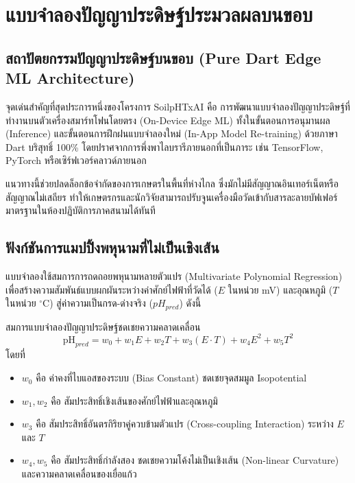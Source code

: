 \chapter{แบบจำลองปัญญาประดิษฐ์ประมวลผลบนขอบ}
\label{chap:edge_ml}

\section{สถาปัตยกรรมปัญญาประดิษฐ์บนขอบ (Pure Dart Edge ML Architecture)}
จุดเด่นสำคัญที่สุดประการหนึ่งของโครงการ SoilpHTxAI คือ การพัฒนาแบบจำลองปัญญาประดิษฐ์ที่ทำงานบนตัวเครื่องสมาร์ทโฟนโดยตรง (On-Device Edge ML) ทั้งในขั้นตอนการอนุมานผล (Inference) และขั้นตอนการฝึกฝนแบบจำลองใหม่ (In-App Model Re-training) ด้วยภาษา Dart บริสุทธิ์ 100\% โดยปราศจากการพึ่งพาไลบรารีภายนอกที่เป็นภาระ เช่น TensorFlow, PyTorch หรือเซิร์ฟเวอร์คลาวด์ภายนอก

แนวทางนี้ช่วยปลดล็อกข้อจำกัดของการเกษตรในพื้นที่ห่างไกล ซึ่งมักไม่มีสัญญาณอินเทอร์เน็ตหรือสัญญาณไม่เสถียร ทำให้เกษตรกรและนักวิจัยสามารถปรับจูนเครื่องมือวัดเข้ากับสารละลายบัฟเฟอร์มาตรฐานในห้องปฏิบัติการภาคสนามได้ทันที

\section{ฟังก์ชันการแมปปิ้งพหุนามที่ไม่เป็นเชิงเส้น}
แบบจำลองใช้สมการการถดถอยพหุนามหลายตัวแปร (Multivariate Polynomial Regression) เพื่อสร้างความสัมพันธ์แบบผกผันระหว่างค่าศักย์ไฟฟ้าที่วัดได้ ($E$ ในหน่วย mV) และอุณหภูมิ ($T$ ในหน่วย $^\circ\text{C}$) สู่ค่าความเป็นกรด-ด่างจริง ($pH_{pred}$) ดังนี้

\begin{formulabox}{สมการแบบจำลองปัญญาประดิษฐ์ชดเชยความคลาดเคลื่อน}
\begin{equation}
\text{pH}_{pred} = w_0 + w_1 E + w_2 T + w_3 (E \cdot T) + w_4 E^2 + w_5 T^2
\label{eq:poly_model}
\end{equation}
โดยที่
\begin{itemize}
    \item $w_0$ คือ ค่าคงที่ไบแอสของระบบ (Bias Constant) ชดเชยจุดสมมูล Isopotential
    \item $w_1, w_2$ คือ สัมประสิทธิ์เชิงเส้นของศักย์ไฟฟ้าและอุณหภูมิ
    \item $w_3$ คือ สัมประสิทธิ์อันตรกิริยาคู่ควบข้ามตัวแปร (Cross-coupling Interaction) ระหว่าง $E$ และ $T$
    \item $w_4, w_5$ คือ สัมประสิทธิ์กำลังสอง ชดเชยความโค้งไม่เป็นเชิงเส้น (Non-linear Curvature) และความคลาดเคลื่อนของเยื่อแก้ว
\end{itemize}
\end{formulabox}

